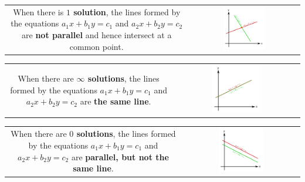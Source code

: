 \documentclass{article}
\begin{document}
\begin{tabular}{cc}
\parbox{0.5\textwidth}{
When there is {\bf \(1\) solution}, the lines formed by the equations \(a_1 x + b_1 y = c_1\) and \(a_2 x + b_2 y = c_2\) are {\bf not parallel} and hence intersect at a common point. 
} & \parbox{0.5\textwidth}{
\includegraphics[width = 0.4\textwidth]{2_variable_system_1_solution}
} 
\end{tabular}

\begin{tabular}{cc}
\parbox{0.5\textwidth}{
When there are {\bf \(\infty\) solutions}, the lines formed by the equations \(a_1 x + b_1 y = c_1\) and \(a_2 x + b_2 y = c_2\) are {\bf the same line}. 
} & \parbox{0.5\textwidth}{
\includegraphics[width = 0.4\textwidth]{2_variable_system_inf_solutions}
} 
\end{tabular}

\begin{tabular}{cc}
\parbox{0.5\textwidth}{
When there are {\bf \(0\) solutions}, the lines formed by the equations \(a_1 x + b_1 y = c_1\) and \(a_2 x + b_2 y = c_2\) are {\bf parallel, but not the same line}. 
} & \parbox{0.5\textwidth}{
\includegraphics[width = 0.4\textwidth]{2_variable_system_0_solutions}
} 
\end{tabular}
\end{document}

